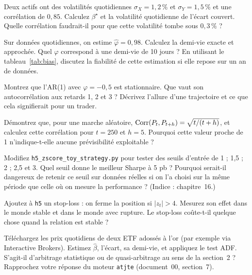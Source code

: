 \documentclass[11pt,a4paper]{article}
\begin{document}
\begin{exercise}
Deux actifs ont des volatilités quotidiennes $\sigma_X = 1{,}2\,\%$ et $\sigma_Y = 1{,}5\,\%$ et une corrélation de $0{,}85$. Calculez $\beta^\star$ et la volatilité quotidienne de l'écart couvert. Quelle corrélation faudrait-il pour que cette volatilité tombe sous $0{,}3\,\%$ ?
\end{exercise}

\begin{exercise}
Sur données quotidiennes, on estime $\hat\varphi = 0{,}98$. Calculez la demi-vie exacte et approchée. Quel $\varphi$ correspond à une demi-vie de 10 jours ? En utilisant le tableau~\ref{tab:bias}, discutez la fiabilité de cette estimation si elle repose sur un an de données.
\end{exercise}

\begin{exercise}
Montrez que l'AR(1) avec $\varphi = -0{,}5$ est stationnaire. Que vaut son autocorrélation aux retards 1, 2 et 3 ? Décrivez l'allure d'une trajectoire et ce que cela signifierait pour un trader.
\end{exercise}

\begin{exercise}
Démontrez que, pour une marche aléatoire, $\operatorname{Corr}(P_t,P_{t+h}) = \sqrt{t/(t+h)}$, et calculez cette corrélation pour $t = 250$ et $h = 5$. Pourquoi cette valeur proche de 1 n'indique-t-elle aucune prévisibilité exploitable ?
\end{exercise}

\begin{exercise}[à coder]
Modifiez \texttt{h5\_zscore\_toy\_strategy.py} pour tester des seuils d'entrée de 1 ; 1,5 ; 2 ; 2,5 et 3. Quel seuil donne le meilleur Sharpe à 5 pb ? Pourquoi serait-il dangereux de retenir ce seuil sur données réelles si on l'a choisi sur la même période que celle où on mesure la performance ? (Indice : chapitre~16.)
\end{exercise}

\begin{exercise}[à coder]
Ajoutez à \texttt{h5} un stop-loss : on ferme la position si $|z_t| > 4$. Mesurez son effet dans le monde stable et dans le monde avec rupture. Le stop-loss coûte-t-il quelque chose quand la relation est stable ?
\end{exercise}

\begin{exercise}
Téléchargez les prix quotidiens de deux ETF adossés à l'or (par exemple via Interactive Brokers). Estimez $\hat\beta$, l'écart, sa demi-vie, et appliquez le test ADF. S'agit-il d'arbitrage statistique ou de quasi-arbitrage au sens de la section~2 ? Rapprochez votre réponse du moteur \texttt{atjte} (document~00, section~7).
\end{exercise}
\end{document}
